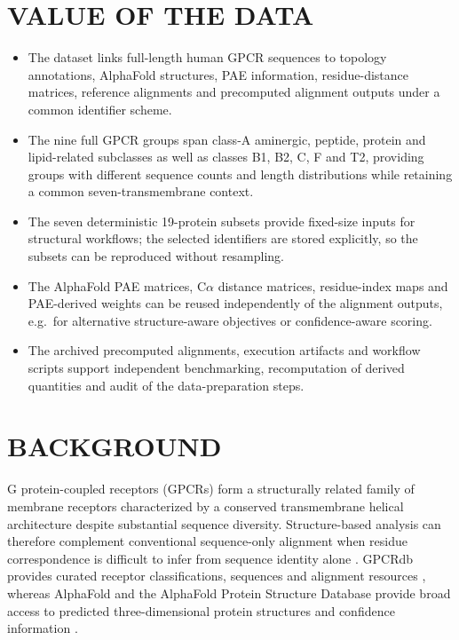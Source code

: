 \documentclass[a4paper,12pt]{article}
\begin{document}
	\section*{VALUE OF THE DATA}
	\begin{itemize}
		\item The dataset links full-length human GPCR sequences to topology annotations, AlphaFold structures, PAE information, residue-distance matrices, reference alignments and precomputed alignment outputs under a common identifier scheme.
		
		\item The nine full GPCR groups span class-A aminergic, peptide, protein and lipid-related subclasses as well as classes B1, B2, C, F and T2, providing groups with different sequence counts and length distributions while retaining a common seven-transmembrane context.
		
		\item The seven deterministic 19-protein subsets provide fixed-size inputs for structural workflows; the selected identifiers are stored explicitly, so the subsets can be reproduced without resampling.
		
		\item The AlphaFold PAE matrices, C$\alpha$ distance matrices, residue-index maps and PAE-derived weights can be reused independently of the alignment outputs, e.g.\ for alternative structure-aware objectives or confidence-aware scoring.
		
		\item The archived precomputed alignments, execution artifacts and workflow scripts support independent benchmarking, recomputation of derived quantities and audit of the data-preparation steps.
	\end{itemize}
	
	\section*{BACKGROUND}
	G protein-coupled receptors (GPCRs) form a structurally related family of membrane receptors characterized by a conserved transmembrane helical architecture despite substantial sequence diversity. Structure-based analysis can therefore complement conventional sequence-only alignment when residue correspondence is difficult to infer from sequence identity alone \cite{cvicek2016gross}. GPCRdb provides curated receptor classifications, sequences and alignment resources \cite{pandyszekeres2023gpcrdb}, whereas AlphaFold and the AlphaFold Protein Structure Database provide broad access to predicted three-dimensional protein structures and confidence information \cite{jumper2021alphafold,varadi2024afdb}.
	
\end{document}
